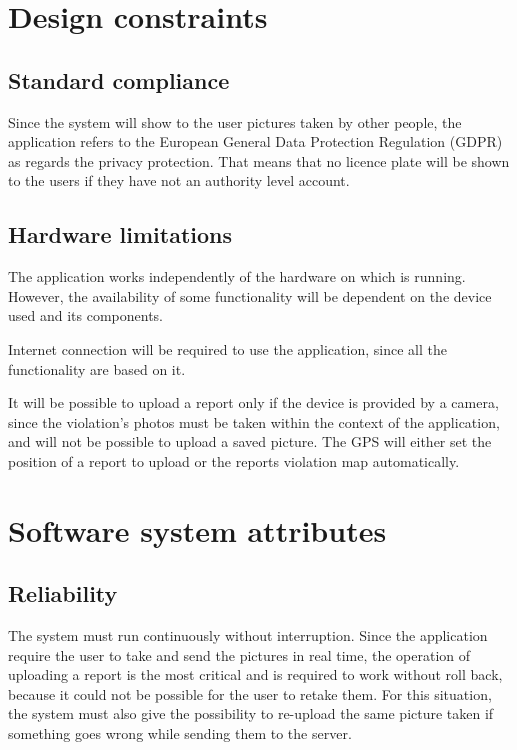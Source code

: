 \documentclass[../RASD.tex]{subfiles}
\begin{document}
        \section{Design constraints}\label{sec:design-constraints}
            \subsection{Standard compliance}\label{subsec:standard-compliance}
            Since the system will show to the user pictures taken by other people, the application refers to the European General Data Protection Regulation (GDPR) as regards the privacy protection. That means that no licence plate will be shown to the users if they have not an authority level account.
            \subsection{Hardware limitations}\label{subsec:hardware-limitations}
            The application works independently of the hardware on which is running. However, the availability of some functionality will be dependent on the device used and its components.

            Internet connection will be required to use the application, since all the functionality are based on it.

            It will be possible to upload a report only if the device is provided by a camera, since the violation's photos must be taken within the context of the application, and will not be possible to upload a saved picture. The GPS will either set the position of a report to upload or the reports violation map automatically.
    \newpage
        \section{Software system attributes}\label{sec:software-system-attributes}
            \subsection{Reliability}\label{subsec:reliability}
            The system must run continuously without interruption. Since the application require the user to take and send the pictures in real time,
            the operation of uploading a report is the most critical and is required to work without roll back, because it could not be possible for the user to retake them.
            For this situation, the system must also give the possibility to re-upload the same picture taken if something goes wrong while sending them to the server.
\end{document}

